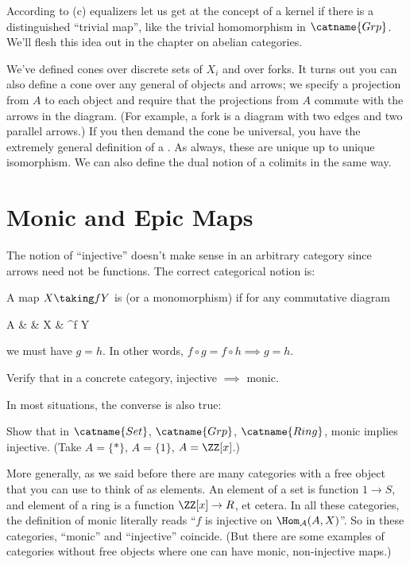 According to (c) equalizers let us get at the concept of a kernel if there is a distinguished
``trivial map'', like the trivial homomorphism in $\catname{Grp}$.
We'll flesh this idea out in the chapter on abelian categories.

\begin{remark}
	We've defined cones over discrete sets of $X_i$ and over forks.
	It turns out you can also define a cone over any general  of objects and arrows;
	we specify a projection from $A$ to each object and
	require that the projections from $A$ commute with the arrows in the diagram.
	(For example, a fork is a diagram with two edges and two parallel arrows.)
	If you then demand the cone be universal, you have the extremely general definition of a .
	As always, these are unique up to unique isomorphism.
	We can also define the dual notion of a colimits in the same way.
\end{remark}

\section{Monic and Epic Maps}
The notion of ``injective'' doesn't make sense in an arbitrary category since arrows need not be functions.
The correct categorical notion is:
\begin{definition}
	A map $X \taking f Y$ is  (or a monomorphism) if for any commutative diagram
	\begin{diagram}
		A &  & X & \rTo^f Y 
	\end{diagram}
	we must have $g = h$.
	In other words, $f \circ g = f \circ h \implies g = h$.
\end{definition}
\begin{ques}
	Verify that in a concrete category,
	injective $\implies$ monic.
\end{ques}
In most situations, the converse is also true:
\begin{exercise}
	Show that in $\catname{Set}$, $\catname{Grp}$, $\catname{Ring}$,
	monic implies injective. (Take $A = \{\ast\}$, $A = \{1\}$, $A = \ZZ[x]$.)
\end{exercise}
More generally, as we said before there are many categories
with a free object that you can use to think of as elements.
An element of a set is function $1 \to S$, and element of a ring is a function $\ZZ[x] \to R$, et cetera.
In all these categories, the definition of monic literally reads ``$f$ is injective on $\Hom_\AA(A, X)$''.
So in these categories, ``monic'' and ``injective'' coincide.
(But there are some examples of categories without free objects where one can have monic,
non-injective maps.)

